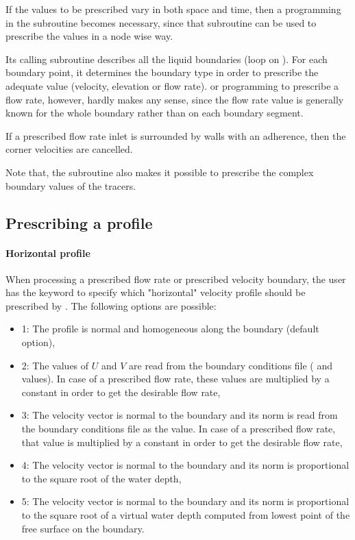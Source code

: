 If the values to be prescribed vary in both space and time, then a programming
in the  subroutine becomes necessary,
since that subroutine can be used to prescribe the values in a node wise way.

Its calling subroutine  describes all the liquid boundaries
(loop on ).
For each boundary point, it determines the boundary type in order to prescribe
the adequate value (velocity, elevation or flow rate).
 or  programming to prescribe a flow rate,
however, hardly makes any sense, since the flow rate value is generally known
for the whole boundary rather than on each boundary segment.

If a prescribed flow rate inlet is surrounded by walls with an adherence, then
the corner velocities are cancelled.

Note that, the  subroutine also makes it possible
to prescribe the complex boundary values of the tracers.

\subsection{Prescribing a profile}


\paragraph{Horizontal profile}

When processing a prescribed flow rate or prescribed velocity boundary, the
user has the keyword  to specify which "horizontal"
velocity profile should be prescribed by . The following options are
possible:

\begin{itemize}
\item 1: The profile is normal and homogeneous along the boundary (default
option),

\item 2: The values of $U$ and $V$ are read from the boundary
conditions file ( and  values).
In case of a prescribed flow rate, these values are multiplied by a constant
in order to get the desirable flow rate,

\item 3: The velocity vector is normal to the boundary and its norm is read
from the boundary conditions file as the  value. In case of a
prescribed flow rate, that value is multiplied by a constant in order to get
the desirable flow rate,

\item 4: The velocity vector is normal to the boundary and its norm is
proportional to the square root of the water depth,

\item 5: The velocity vector is normal to the boundary and its norm is
proportional to the square root of a virtual water depth computed from lowest
point of the free surface on the boundary.
\end{itemize}


